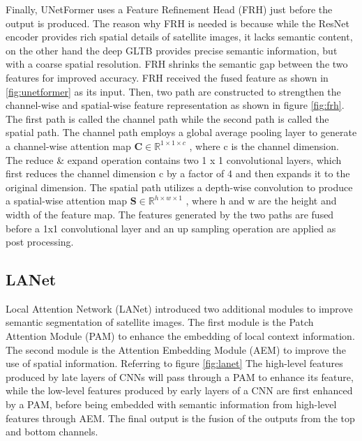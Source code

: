 Finally, UNetFormer uses a Feature Refinement Head (FRH) just before the output is produced. The reason why FRH is needed is because while the ResNet encoder provides rich spatial details of satellite images, it lacks semantic content, on the other hand the deep GLTB provides precise semantic information, but with a coarse spatial resolution. FRH shrinks the semantic gap between the two features for improved accuracy. FRH received the fused feature as shown in \ref{fig:unetformer} as its input. Then, two path are constructed to strengthen the channel-wise and spatial-wise feature representation as shown in figure \ref{fig:frh}. The first path is called the channel path while the second path is called the spatial path. The channel path employs a global average pooling layer to generate a channel-wise attention map $\textbf{C} \in \mathbb{R}^{1\times 1 \times c}$ , where c is the channel dimension. The reduce \& expand operation contains two 1 x 1 convolutional layers, which first reduces the channel dimension c by a factor of 4 and then expands it to the original dimension. The spatial path utilizes a depth-wise convolution to produce a spatial-wise attention map $\textbf{S} \in \mathbb{R}^{h\times w \times 1}$  , where h and w are the height and width of the feature map. The features generated by the two paths are fused before a 1x1 convolutional layer and an up sampling operation are applied as post processing.

\subsection{LANet}
Local Attention Network (LANet) \cite{lanet}introduced two additional modules to improve semantic segmentation of satellite images. The first module is the Patch Attention Module (PAM) to enhance the embedding of local context information. The second module is the Attention Embedding Module (AEM) to improve the use of spatial information. Referring to figure \ref{fig:lanet} The high-level features produced by late layers of CNNs will pass through a PAM to enhance its feature, while the low-level features produced by early layers of a CNN are first enhanced by a PAM, before being embedded with semantic information from high-level features through AEM. The final output is the fusion of the outputs from the top and bottom channels. 

